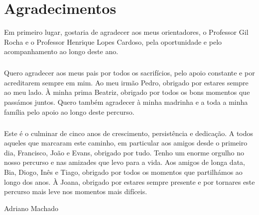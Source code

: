 
\chapter*{Agradecimentos}


Em primeiro lugar, gostaria de agradecer aos meus orientadores, o Professor Gil Rocha e o Professor Henrique Lopes Cardoso, pela oportunidade e pelo acompanhamento ao longo deste ano.

\paragraph{}

Quero agradecer aos meus pais por todos os sacrifícios, pelo apoio constante e por acreditarem sempre em mim. Ao meu irmão Pedro, obrigado por estares sempre ao meu lado. À minha prima Beatriz, obrigado por todos os bons momentos que passámos juntos. Quero também agradecer à minha madrinha e a toda a minha família pelo apoio ao longo deste percurso.

\paragraph{}

Este é o culminar de cinco anos de crescimento, persistência e dedicação. A todos aqueles que marcaram este caminho, em particular aos amigos desde o primeiro dia, Francisco, João e Evans, obrigado por tudo. Tenho um enorme orgulho no nosso percurso e nas amizades que levo para a vida. Aos amigos de longa data, Bia, Diogo, Inês e Tiago, obrigado por todos os momentos que partilhámos ao longo dos anos. À Joana, obrigado por estares sempre presente e por tornares este percurso mais leve nos momentos mais difíceis.

\vspace{10mm}

\begin{flushleft}
Adriano Machado
\end{flushleft}